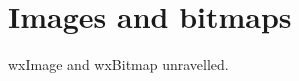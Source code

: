 \chapter{Images and bitmaps}\label{chapimages}
%
%
\setfooter{\thepage}{}{}{}{}{\thepage}%

wxImage and wxBitmap unravelled.

